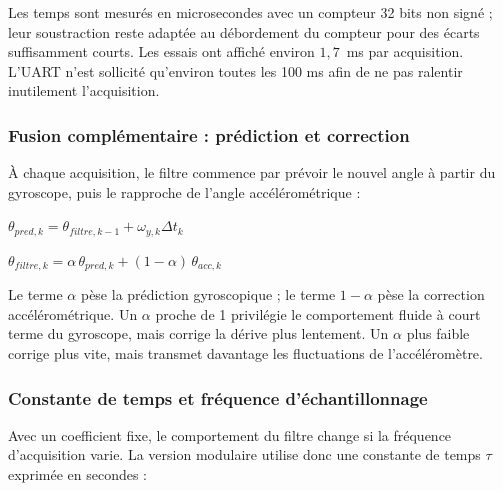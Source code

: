 \documentclass[11pt,a4paper]{article}
\begin{document}
	Les temps sont mesurés en microsecondes avec un compteur 32 bits non signé ; leur soustraction reste adaptée au débordement du compteur pour des écarts suffisamment courts. Les essais ont affiché environ \(1{,}7\)~ms par acquisition. L'UART n'est sollicité qu'environ toutes les 100 ms afin de ne pas ralentir inutilement l'acquisition.
	
	\subsubsection*{Fusion complémentaire : prédiction et correction}
	
	À chaque acquisition, le filtre commence par prévoir le nouvel angle à partir du gyroscope, puis le rapproche de l'angle accélérométrique :
	
	\begin{center}
		\(\displaystyle \theta_{pred,k}=\theta_{filtre,k-1}+\omega_{y,k}\Delta t_k\)
	\end{center}
	
	\begin{center}
		\(\displaystyle \boxed{\theta_{filtre,k}=\alpha\,\theta_{pred,k}+(1-\alpha)\,\theta_{acc,k}}\)
	\end{center}
	
	Le terme \(\alpha\) pèse la prédiction gyroscopique ; le terme \(1-\alpha\) pèse la correction accélérométrique. Un \(\alpha\) proche de 1 privilégie le comportement fluide à court terme du gyroscope, mais corrige la dérive plus lentement. Un \(\alpha\) plus faible corrige plus vite, mais transmet davantage les fluctuations de l'accéléromètre.
	
	\begin{center}
	\end{center}
	
	\subsubsection*{Constante de temps et fréquence d'échantillonnage}
	
	Avec un coefficient fixe, le comportement du filtre change si la fréquence d'acquisition varie. La version modulaire utilise donc une constante de temps \(\tau\) exprimée en secondes :
	
\end{document}
